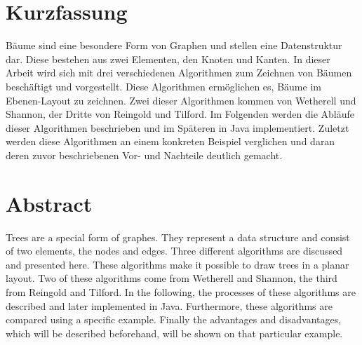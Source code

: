 \section*{Kurzfassung}
Bäume sind eine besondere Form von Graphen und stellen eine Datenstruktur dar. Diese bestehen aus zwei Elementen, 
den Knoten und Kanten. In dieser Arbeit wird sich mit drei verschiedenen Algorithmen zum Zeichnen von Bäumen
beschäftigt und vorgestellt. Diese Algorithmen ermöglichen es, 
Bäume im Ebenen-Layout zu zeichnen. Zwei dieser Algorithmen kommen von Wetherell und Shannon, der Dritte von Reingold und Tilford.
Im Folgenden werden die Abläufe dieser Algorithmen beschrieben und im Späteren in Java implementiert. Zuletzt werden diese Algorithmen 
an einem konkreten Beispiel verglichen und daran deren zuvor beschriebenen Vor- und Nachteile deutlich gemacht.

\vfill\vfill\vfill\vfill\vfill\vfill
\section*{Abstract}
Trees are a special form of graphes. They represent a data structure and consist of two elements,
the nodes and edges. Three different algorithms are discussed and presented here. These algorithms make it possible to
draw trees in a planar layout. Two of these algorithms come from Wetherell and Shannon, the third from Reingold and Tilford.
In the following, the processes of these algorithms are described and later implemented in Java. Furthermore, these algorithms are
compared using a specific example. Finally the advantages and disadvantages, which will be described beforehand, will be shown on that 
particular example.
\vfill\vfill\vfill\vfill\vfill\vfill